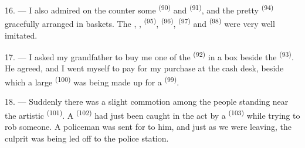 16. --- I also admired on the counter some  \textsuperscript{(90)} and
 \textsuperscript{(91)}, and the pretty
 \textsuperscript{(94)} gracefully arranged in baskets. The
, ,  \textsuperscript{(95)},
 \textsuperscript{(96)},  \textsuperscript{(97)} and
 \textsuperscript{(98)} were very well imitated.

\VUsaut{4.4mm}
\VUsaut{2.8mm}

17. --- I asked my grandfather to buy me one of the 
\textsuperscript{(92)} in a box beside the  \textsuperscript{(93)}. He agreed,
and I went myself to pay for my purchase at the cash desk, beside which a
large  \textsuperscript{(100)} was being made up for a 
\textsuperscript{(99)}.

18. --- Suddenly there was a slight commotion among the people standing
near the artistic  \textsuperscript{(101)}. A 
\textsuperscript{(102)} had just been caught in the act by a 
\textsuperscript{(103)} while trying to rob someone. A policeman was sent for to
 him, and just as we were leaving, the culprit was being led
off to the police station.
\VUsaut{6.0mm}
\VUfilet{22mm}
